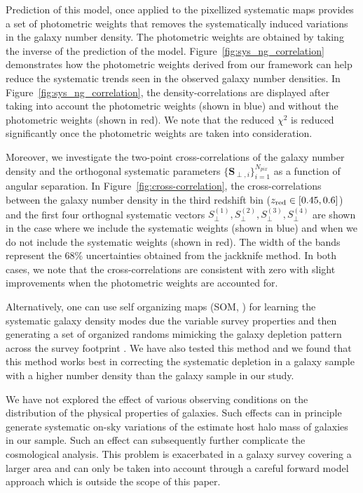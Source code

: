 \documentclass[fleqn,usenatbib,useAMS]{mnras}
\begin{document}
Prediction of this model, once applied to the pixellized systematic maps provides a set of photometric weights that removes the systematically induced variations in the galaxy number density. The photometric weights are obtained by taking the inverse of the prediction of the model. Figure~\ref{fig:sys_ng_correlation} demonstrates how the photometric weights derived from our framework can help reduce the systematic trends seen in the observed galaxy number densities. In Figure~\ref{fig:sys_ng_correlation}, the density-correlations are displayed after taking into account the photometric weights (shown in blue) and without the photometric weights (shown in red). We note that the reduced $\chi^{2}$ is reduced significantly once the photometric weights are taken into consideration. 

Moreover, we investigate the two-point cross-correlations of the galaxy number density and the orthogonal systematic parameters $\{\mathbf{S}_{\perp, i}\}_{i=1}^{N_{pix}}$ as a function of angular separation. In Figure~\ref{fig:cross-correlation}, the cross-correlations between the galaxy number density in the third redshift bin ($z_{\rm red} \in [0.45, 0.6]$) and the first four orthognal systematic vectors $S_{\perp}^{(1)}, S_{\perp}^{(2)}, S_{\perp}^{(3)}, S_{\perp}^{(4)}$ are shown in the case where we include the systematic weights (shown in blue) and when we do not include the systematic weights (shown in red). The width of the bands represent the 68\% uncertainties obtained from the jackknife method. In both cases, we note that the cross-correlations are consistent with zero with slight improvements when the photometric weights are accounted for.

Alternatively, one can use self organizing maps (SOM, \citealt{kohonen1997}) for learning the systematic galaxy density modes due the variable survey properties and then generating a set of organized randoms mimicking the galaxy depletion pattern across the survey footprint \citep{som2020}. We have also tested this method and we found that this method works best in correcting the systematic depletion in a galaxy sample with a higher number density than the galaxy sample in our study. 

We have not explored the effect of various observing conditions on the distribution of the physical properties of galaxies. Such effects can in principle generate systematic on-sky variations of the estimate host halo mass of galaxies in our sample. Such an effect can subsequently further complicate the cosmological analysis. This problem is exacerbated in a galaxy survey covering a larger area and can only be taken into account through a careful forward model approach which is outside the scope of this paper.  
\end{document}
